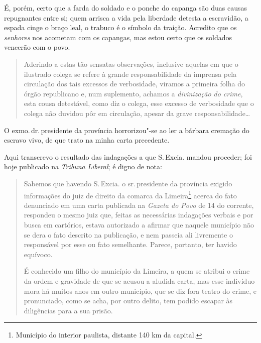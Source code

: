 É, porém, certo que a farda do soldado e o ponche do capanga são duas
causas repugnantes entre si; quem arrisca a vida pela liberdade detesta
a escravidão, a espada cinge o braço leal, o trabuco é o símbolo da
traição. Acredito que os \emph{senhores} nos acometam com os capangas,
mas estou certo que os soldados vencerão com o povo.


\begin{quote}
Aderindo a estas tão sensatas observações, inclusive aquelas em que o
ilustrado colega se refere à grande responsabilidade da imprensa pela
circulação dos tais excessos de verbosidade, viramos a primeira folha do
órgão republicano e, num suplemento, achamos a \emph{divinização do
crime}, esta cousa detestável, como diz o colega, esse excesso de
verbosidade que o colega não duvidou pôr em circulação, apesar da grave
responsabilidade\ldots{}
\end{quote}

O exmo.\,dr.\,presidente da província horrorizou"-se ao ler a bárbara
cremação do escravo vivo, de que trato na minha carta precedente.

Aqui transcrevo o resultado das indagações a que S.\,Excia. mandou
proceder; foi hoje publicado na \emph{Tribuna} \emph{Liberal}; é digno
de nota:

\begin{quote}
Sabemos que havendo S.\,Excia. o sr.\,presidente da província exigido
informações do juiz de direito da comarca da Limeira\footnote{
  Município do interior paulista, distante 140 km da capital.} acerca do
fato denunciado em uma carta publicada na \emph{Gazeta do Povo} de 14 do
corrente, respondeu o mesmo juiz que, feitas as necessárias indagações
verbais e por busca em cartórios, estava autorizado a afirmar que
naquele município não se dera o fato descrito na publicação, e nem
passeia ali livremente o responsável por esse ou fato semelhante.
Parece, portanto, ter havido equívoco.

É conhecido um filho do município da Limeira, a quem se atribui o crime
da ordem e gravidade de que se acusou a aludida carta, mas esse
indivíduo mora há muitos anos em outro município, que se diz fora teatro
do crime, e pronunciado, como se acha, por outro delito, tem podido
escapar às diligências para a sua prisão.
\end{quote}

